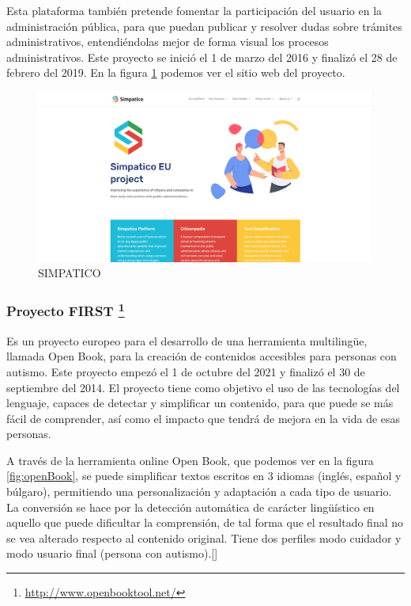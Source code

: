 Esta plataforma también pretende fomentar la participación del usuario en la administración pública, para que puedan publicar y resolver dudas sobre trámites administrativos, entendiéndolas mejor de forma visual los procesos administrativos. Este proyecto se inició el 1 de marzo del 2016 y finalizó el 28 de febrero del 2019. En la figura \ref{fig:simpatico} podemos ver el sitio web del proyecto.


\begin{figure}[h]
	\centering
	\includegraphics[width=1.0\textwidth]{Imagenes/ProyectosMateriales/simpatico}
	\caption{SIMPATICO}
	\label{fig:simpatico}
\end{figure} 


\newpage

\subsubsection{Proyecto FIRST \footnote{\href{http://www.openbooktool.net/}{http://www.openbooktool.net/}}}

Es un proyecto europeo para el desarrollo de una herramienta multilingüe, llamada Open Book, para la creación de contenidos accesibles para personas con autismo. Este proyecto empezó el 1 de octubre del 2021 y finalizó el 30 de septiembre del 2014.
El proyecto tiene como objetivo el uso de las tecnologías del lenguaje, capaces de detectar y simplificar un contenido, para que puede se más fácil de comprender, así como el impacto que tendrá de mejora en la vida de esas personas. 

A través de la herramienta online Open Book, que podemos ver en la figura \ref{fig:openBook}, se puede simplificar textos escritos en 3 idiomas (inglés, español y búlgaro), permitiendo una personalización y adaptación a cada tipo de usuario. La conversión se hace por la detección automática de carácter lingüístico en aquello que puede dificultar la comprensión, de tal forma que el resultado final no se vea alterado respecto al contenido original. Tiene dos perfiles modo cuidador y modo usuario final (persona con autismo).[\cite{openBook}]



